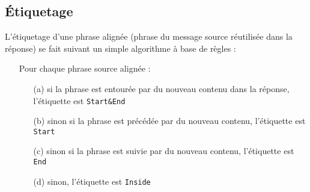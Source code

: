 \subsection{Étiquetage}

\label{subsec:labelling}

L'étiquetage d'une phrase alignée (phrase du message source réutilisée dans la réponse) se fait suivant un simple algorithme à base de règles :

\begin{itemize}
    \item[] Pour chaque phrase source alignée :
    \begin{itemize}
        \item[(a)] si la phrase est entourée par du nouveau contenu dans la réponse, l'étiquette est \texttt{Start\&End}
        \item[(b)] sinon si la phrase est précédée par du nouveau contenu, l'étiquette est \texttt{Start}
        \item[(c)] sinon si la phrase est suivie par du nouveau contenu, l'étiquette est \texttt{End}
        \item[(d)] sinon, l'étiquette est \texttt{Inside}
    \end{itemize}
\end{itemize}